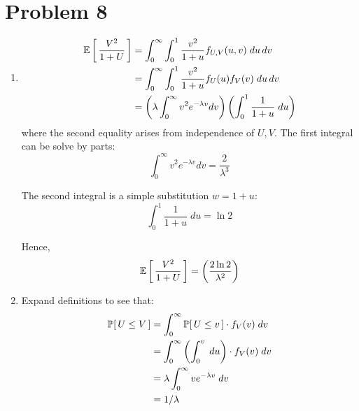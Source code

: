 \documentclass[12pt]{article}%
\begin{document}
\section{Problem 8}
\begin{enumerate}
  \item
  \begin{align*}
      \mathbb{E}\left[\,\frac{V^2}{1 + U}\,\right] & = \int_{0}^\infty\int_{0}^1 \frac{v^2}{1 + u} f_{U,V}(u,v) \; du \, dv \\
      & = \int_{0}^\infty\int_{0}^1 \frac{v^2}{1 + u} f_{U}(u)f_V(v) \; du \, dv \\
      & = \left(\lambda \int_0^\infty v^2 e^{-\lambda v} dv  \right)\left(\int_0^1 \frac{1}{1 + u} \; du\right)
  \end{align*}
  where the second equality arises from independence of $U,V$.
  The first integral can be solve by parts:
  \[\int_0^\infty v^2 e^{-\lambda v} dv = \frac{2}{\lambda^3} \]

  The second integral is a simple substitution $w = 1 + u$:
  \[ \int_0^1 \frac{1}{1 + u} \; du  = \ln{2}\]

  Hence,
  \[\mathbb{E}\left[\,\frac{V^2}{1 + U}\,\right] = \left(\frac{2\ln{2}}{\lambda^2}\right)\]

  \item
  Expand definitions to see that:
  \begin{align*}
    \mathbb{P}[\,U \leq V\,]
    & = \int_{0}^\infty \mathbb{P}[\,U \leq v\,]\cdot f_V(v) \; dv \\
    & = \int_0^\infty \left(\int_0^v  \; du\right) \cdot f_V(v) \; dv \\
    & = \lambda \int_0^\infty v e^{-\lambda v} \; dv \\
    & = 1/\lambda
  \end{align*}
\end{enumerate}
\end{document}
